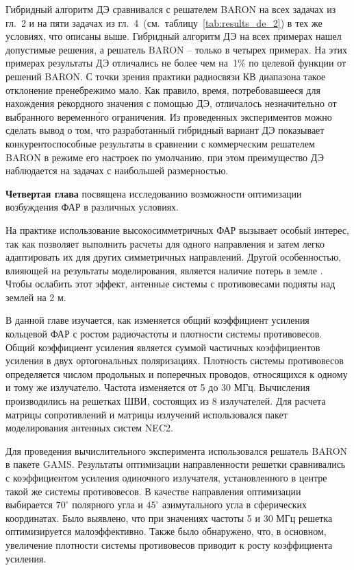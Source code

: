 Гибридный алгоритм ДЭ сравнивался с решателем BARON на всех задачах из гл.~2 и на пяти задачах из гл.~4~(см.~таблицу~\ref{tab:results_de_2}) в тех же условиях, что описаны выше. Гибридный алгоритм ДЭ на всех примерах нашел допустимые решения, а решатель BARON -- только в четырех примерах. На этих примерах результаты ДЭ отличались не более чем на~1\% по целевой функции от решений BARON. С точки зрения практики радиосвязи КВ диапазона такое отклонение пренебрежимо мало. Как правило, время, потребовавшееся для нахождения рекордного значения с помощью ДЭ, отличалось незначительно от выбранного веременн\'{о}го ограничения. Из проведенных экспериментов можно сделать вывод о том, что разработанный гибридный вариант ДЭ показывает конкурентоспособные результаты в сравнении с коммерческим решателем BARON в режиме его настроек по умолчанию, при этом преимущество ДЭ наблюдается на задачах с наибольшей размерностью.

{\textbf{Четвертая глава}} посвящена исследованию возможности оптимизации возбуждения ФАР в различных условиях.

На практике использование высокосимметричных ФАР вызывает особый интерес, так как позволяет выполнить расчеты для одного направления и затем легко адаптировать их для других симметричных направлений. Другой особенностью, влияющей на результаты моделирования, является наличие потерь в земле . Чтобы ослабить этот эффект, антенные системы с противовесами подняты над землей на 2 м.

В данной главе изучается, как изменяется общий коэффициент усиления кольцевой ФАР с ростом радиочастоты и плотности системы противовесов. Общий коэффициент усиления является суммой частичных коэффициентов усиления в  двух ортогональных поляризациях. Плотность системы противовесов определяется числом продольных и поперечных проводов, относящихся к одному и тому же излучателю. Частота изменяется от 5 до 30 МГц. Вычисления производились на решетках ШВИ, состоящих из 8 излучателей. Для расчета матрицы сопротивлений и матрицы излучений использовался пакет моделирования антенных систем NEC2.

Для проведения вычислительного эксперимента использовался решатель BARON в пакете GAMS. Результаты оптимизации направленности решетки сравнивались с коэффициентом усиления одиночного излучателя, установленного в центре такой же системы противовесов. В качестве направления оптимизации выбирается $70^{\circ}$ полярного угла и $45^{\circ}$ азимутального угла в сферических координатах. Было выявлено, что при значениях частоты 5 и 30 МГц решетка оптимизируется малоэффективно. Также было обнаружено, что, в основном, увеличение плотности системы противовесов приводит к росту коэффициента усиления.

